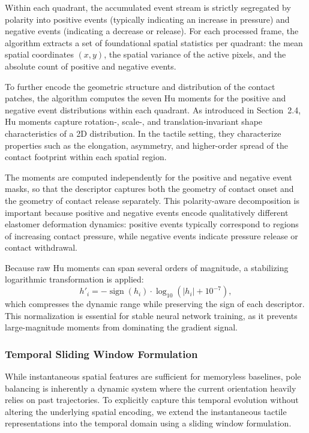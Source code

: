 \documentclass{article}
\begin{document}
\par Within each quadrant, the accumulated event stream is strictly segregated by polarity into positive events (typically indicating an increase in pressure) and negative events (indicating a decrease or release). For each processed frame, the algorithm extracts a set of foundational spatial statistics per quadrant: the mean spatial coordinates $(x, y)$, the spatial variance of the active pixels, and the absolute count of positive and negative events.

\par To further encode the geometric structure and distribution of the contact patches, the algorithm computes the seven Hu moments for the positive and negative event distributions within each quadrant. As introduced in Section~2.4, Hu moments capture rotation-, scale-, and translation-invariant shape characteristics of a 2D distribution. In the tactile setting, they characterize properties such as the elongation, asymmetry, and higher-order spread of the contact footprint within each spatial region.

The moments are computed independently for the positive and negative event masks, so that the descriptor captures both the geometry of contact onset and the geometry of contact release separately. This polarity-aware decomposition is important because positive and negative events encode qualitatively different elastomer deformation dynamics: positive events typically correspond to regions of increasing contact pressure, while negative events indicate pressure release or contact withdrawal.

Because raw Hu moments can span several orders of magnitude, a stabilizing logarithmic transformation is applied:
$$ h'_i = -\operatorname{sign}(h_i) \cdot \log_{10}(|h_i| + 10^{-7}), $$
which compresses the dynamic range while preserving the sign of each descriptor. This normalization is essential for stable neural network training, as it prevents large-magnitude moments from dominating the gradient signal.

\subsubsection{Temporal Sliding Window Formulation}

While instantaneous spatial features are sufficient for memoryless baselines, pole balancing is inherently a dynamic system where the current orientation heavily relies on past trajectories. To explicitly capture this temporal evolution without altering the underlying spatial encoding, we extend the instantaneous tactile representations into the temporal domain using a sliding window formulation.
\end{document}
